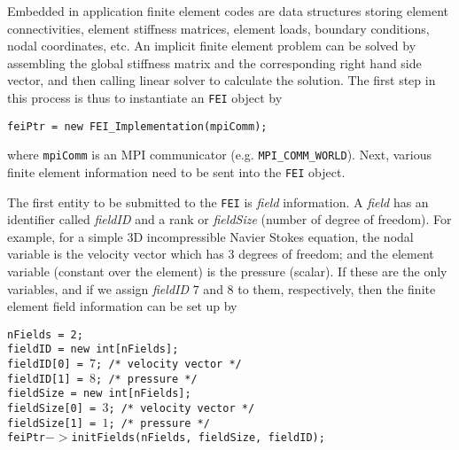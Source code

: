 Embedded in application finite element codes are data structures
storing element connectivities, element stiffness matrices, element
loads, boundary conditions, nodal coordinates, etc. An implicit finite
element problem can be solved by assembling the global stiffness matrix
and the corresponding right hand side vector, and then calling linear
solver to calculate the solution. The first step in this process is 
thus to instantiate an {\tt FEI} object by
\begin{tabbing}
\hspace{0.5in} \= {\tt feiPtr = new FEI\_Implementation(mpiComm);}
\end{tabbing}
where {\tt mpiComm} is an MPI communicator (e.g. {\tt MPI\_COMM\_WORLD}).
Next, various finite element information need to be sent into the {\tt FEI}
object.

The first entity to be submitted to the {\tt FEI} is {\it field} information. 
A {\it field} has an identifier called {\it fieldID} and a rank or
{\it fieldSize} (number of degree of freedom). For example, for a simple
3D incompressible Navier Stokes equation, the nodal variable is the velocity
vector which has $3$ degrees of freedom; and the element variable (constant
over the element) is the pressure (scalar). If these are the only variables,
and if we assign {\it fieldID} $7$ and $8$ to them, respectively, then the
finite element field information can be set up by
\begin{tabbing}
\hspace{0.5in} \= {\tt nFields = 2;} \\
               \> {\tt fieldID = new int[nFields];} \\
               \> {\tt fieldID[0] = $7$; /* velocity vector */} \\
               \> {\tt fieldID[1] = $8$; /* pressure */} \\
               \> {\tt fieldSize = new int[nFields];} \\
               \> {\tt fieldSize[0] = $3$; /* velocity vector */} \\
               \> {\tt fieldSize[1] = $1$; /* pressure */ } \\
               \> {\tt feiPtr$->$initFields(nFields, fieldSize, fieldID);}
\end{tabbing}

